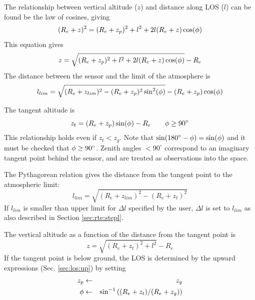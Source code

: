   The relationship between vertical altitude ($z$) and distance along
  LOS ($l$) can be found be the law of cosines, giving
  \begin{equation}
    (R_e+z)^2 = (R_e+z_p)^2 + l^2 + 2l(R_e+z)\cos(\phi)
  \end{equation}
  This equation gives
  \begin{equation}
    z = \sqrt{ (R_e+z_p)^2 + l^2 + 2l(R_e+z)\cos(\phi) } - R_e
  \end{equation}
  The distance between the sensor and the limit of the atmosphere is
  \begin{equation}
      l_{lim} = \sqrt{ (R_e+z_{lim})^2 - (R_e+z_p)^2\sin^2(\phi) } - 
                                       (R_e+z_p)\cos(\phi)
  \end{equation}


  \label{sec:los:limb}
  
  The tangent altitude is
  \begin{equation}
    z_t = (R_e+z_p)\sin(\phi) - R_e \qquad  \phi\geq90^\circ
   \label{eq:los:ztan}
  \end{equation}
  This relationship holds even if $z_t<z_g$. Note that
  $\sin(180^\circ-\phi)=\sin(\phi)$ and it must be checked that
  $\phi\geq90^\circ$. Zenith angles $<90^\circ$ correspond to an
  imaginary tangent point behind the sensor, and are treated as
  observations into the space.
  
  The Pythagorean relation gives the distance from the tangent point
  to the atmospheric limit:
  \begin{equation}
      l_{lim} = \sqrt{ (R_e+z_{lim})^2 - (R_e+z_t)^2}
  \end{equation}
  If $l_{lim}$ is smaller than upper limit for $\Delta l$ specified by
  the user, $\Delta l$ is set to $l_{lim}$ as also described in Section
  \ref{sec:rte:stepl}.

  The vertical altitude as a function of the distance from the
  tangent point is
  \begin{equation}
    z = \sqrt{ (R_e+z_t)^2 + l^2} - R_e
  \end{equation}
  If the tangent point is below ground, the LOS is determined by the
  upward expressions (Sec. \ref{sec:los:up}) by setting
  \begin{eqnarray}
     z_p  & \gets & z_g          \nonumber  \\
     \phi & \gets & \sin^{-1}\left((R_e+z_t)/(R_e+z_g) \right) \nonumber 
  \end{eqnarray}



